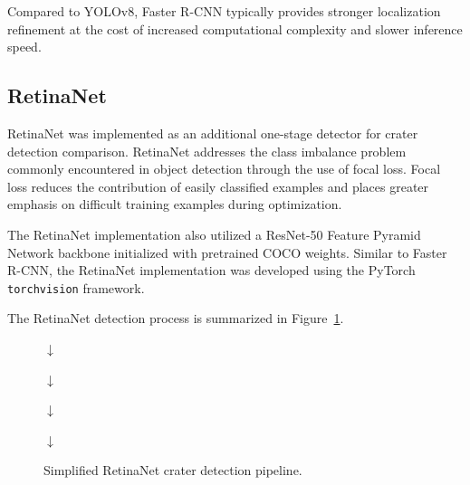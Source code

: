\documentclass[conference]{IEEEtran}
\begin{document}
	Compared to YOLOv8, Faster R-CNN typically provides stronger localization refinement at the cost of increased computational complexity and slower inference speed.
	
	\subsection{RetinaNet}
	
	RetinaNet was implemented as an additional one-stage detector for crater detection comparison. RetinaNet addresses the class imbalance problem commonly encountered in object detection through the use of focal loss. Focal loss reduces the contribution of easily classified examples and places greater emphasis on difficult training examples during optimization.
	
	The RetinaNet implementation also utilized a ResNet-50 Feature Pyramid Network backbone initialized with pretrained COCO weights. Similar to Faster R-CNN, the RetinaNet implementation was developed using the PyTorch \texttt{torchvision} framework.
	
	The RetinaNet detection process is summarized in Figure~\ref{fig:retinanet_pipeline}.
	
	\begin{figure}[h]
		\centering
		
		
		\vspace{0.15cm}
		
		$\downarrow$
		
		\vspace{0.15cm}
		
		
		\vspace{0.15cm}
		
		$\downarrow$
		
		\vspace{0.15cm}
		
		
		\vspace{0.15cm}
		
		$\downarrow$
		
		\vspace{0.15cm}
		
		
		\vspace{0.15cm}
		
		$\downarrow$
		
		\vspace{0.15cm}
		
		
		\caption{Simplified RetinaNet crater detection pipeline.}
		\label{fig:retinanet_pipeline}
		
	\end{figure}
	
\end{document}
